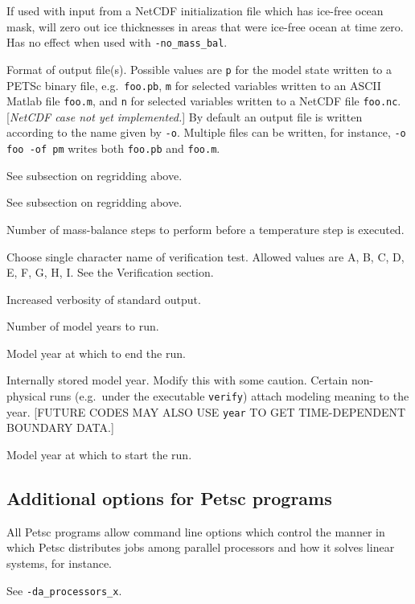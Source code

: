 \documentclass[11pt,final]{amsart}
\begin{document}
  If used with input from a NetCDF initialization file which has ice-free ocean mask, will zero out ice thicknesses in areas that were ice-free ocean at time zero.  Has no effect when used with \verb|-no_mass_bal|.

  Format of output file(s).  Possible values are \verb|p| for the model state written to a PETSc binary file, e.g.~\verb|foo.pb|, \verb|m| for selected variables written to an ASCII Matlab file \verb|foo.m|, and \verb|n| for selected variables written to a NetCDF file \verb|foo.nc|.  [\emph{NetCDF case not yet implemented.}]  By default an output file is written according to the name given by \verb|-o|.  Multiple files can be written, for instance, \verb|-o foo -of pm| writes both \verb|foo.pb| and \verb|foo.m|.

  See subsection on regridding above.

  See subsection on regridding above.

  Number of mass-balance steps to perform before a temperature step is executed.

  Choose single character name of verification test.  Allowed values are A, B, C, D, E, F, G, H, I.  See the Verification section.

   Increased verbosity of standard output.

 Number of model years to run.

 Model year at which to end the run.

  Internally stored model year.  Modify this with some caution.  Certain non-physical runs (e.g.~under the executable \verb|verify|) attach modeling meaning to the year.  [FUTURE CODES MAY ALSO USE \verb|year| TO GET TIME-DEPENDENT BOUNDARY DATA.]

 Model year at which to start the run.


\subsection{Additional options for Petsc programs}  All Petsc programs allow command line options which control the manner in which Petsc distributes jobs among parallel processors and how it solves linear systems, for instance.


  See \verb|-da_processors_x|.
\end{document}

